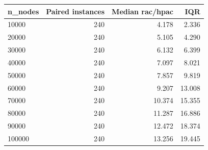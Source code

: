 \begin{tabular}{lrrr}
\toprule
n\_nodes & Paired instances & Median rac/hpac & IQR \\
\midrule
10000 & 240 & 4.178 & 2.336 \\
20000 & 240 & 5.105 & 4.290 \\
30000 & 240 & 6.132 & 6.399 \\
40000 & 240 & 7.097 & 8.021 \\
50000 & 240 & 7.857 & 9.819 \\
60000 & 240 & 9.207 & 13.008 \\
70000 & 240 & 10.374 & 15.355 \\
80000 & 240 & 11.287 & 16.886 \\
90000 & 240 & 12.472 & 18.374 \\
100000 & 240 & 13.256 & 19.445 \\
\bottomrule
\end{tabular}
